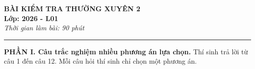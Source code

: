 \documentclass[12pt]{article}
\begin{document}
	
	\begin{center}
		{\Large \textbf{BÀI KIỂM TRA THƯỜNG XUYÊN 2}} \\[6pt]
		{\large \textbf{Lớp: 2026 - L01}} \\[6pt]
		\textit{Thời gian làm bài: 90 phút}
	\end{center}
	\vspace{3mm}
	\hrule
	\vspace{6mm}
	
	\noindent\textbf{PHẦN I. Câu trắc nghiệm nhiều phương án lựa chọn.} Thí sinh trả lời từ câu 1 đến câu 12. Mỗi câu hỏi thí sinh chỉ chọn một phương án.
	\vspace{3mm}
	
\end{document}
